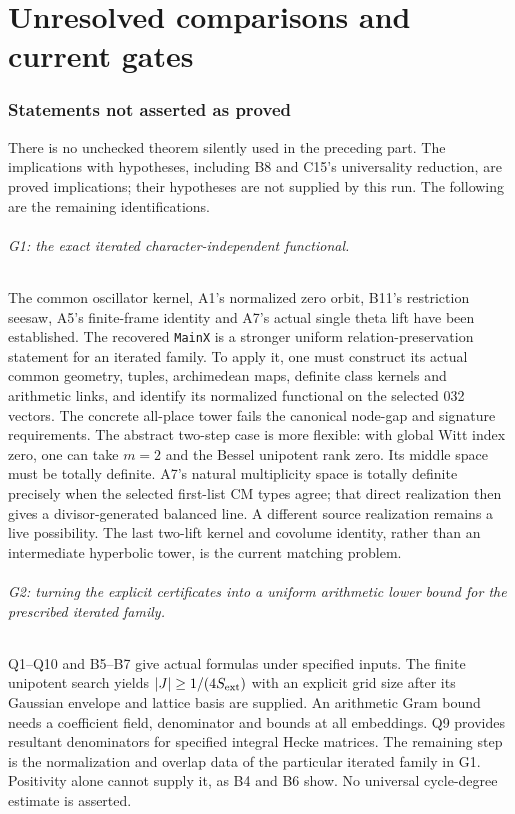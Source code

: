 \part{Unresolved comparisons and current gates}
\section{Statements not asserted as proved}

There is no unchecked theorem silently used in the preceding part.
The implications with hypotheses, including B8 and C15's universality
reduction, are proved implications; their hypotheses are not supplied
by this run. The following are the remaining identifications.

\paragraph{G1: the exact iterated character-independent functional.}
The common oscillator kernel, A1's normalized zero orbit, B11's
restriction seesaw, A5's finite-frame identity and A7's actual single
theta lift have been established. The recovered \texttt{MainX} is
a stronger uniform relation-preservation statement for an iterated
family. To apply it, one must construct its actual common geometry,
tuples, archimedean maps, definite class kernels and arithmetic links,
and identify its normalized functional on the selected 032 vectors.
The concrete all-place tower fails the canonical node-gap and
signature requirements. The abstract two-step case is more flexible:
with global Witt index zero, one can take $m=2$ and the Bessel
unipotent rank zero. Its middle space must be totally definite.
A7's natural multiplicity space is totally definite precisely when
the selected first-list CM types agree; that direct realization then
gives a divisor-generated balanced line. A different source
realization remains a live possibility. The last two-lift kernel
and covolume identity, rather than an intermediate hyperbolic tower,
is the current matching problem.

\paragraph{G2: turning the explicit certificates into a uniform
arithmetic lower bound for the prescribed iterated family.}
Q1--Q10 and B5--B7 give actual formulas under specified inputs.
The finite unipotent search yields $|J|\geq1/(4S_{\rm ext})$ with
an explicit grid size after its Gaussian envelope and lattice basis
are supplied. An arithmetic Gram bound needs a coefficient field,
denominator and bounds at all embeddings. Q9 provides resultant
denominators for specified integral Hecke matrices. The remaining
step is the normalization and overlap data of the particular
iterated family in G1. Positivity alone cannot supply it, as B4
and B6 show. No universal cycle-degree estimate is asserted.

